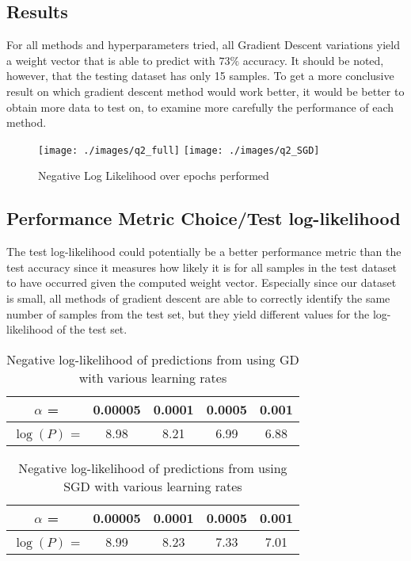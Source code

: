\subsection{Results}
For all methods and hyperparameters tried, all Gradient Descent variations yield a weight vector that is able to predict with $73\%$ accuracy. It should be noted, however, that the testing dataset has only 15 samples. To get a more conclusive result on which gradient descent method would work better, it would be better to obtain more data to test on, to examine more carefully the performance of each method.

\begin{figure}[H]
\centering
\texttt{[image: ./images/q2\_full]}
\texttt{[image: ./images/q2\_SGD]}
\caption{Negative Log Likelihood over epochs performed}
\end{figure}

\subsection{Performance Metric Choice/Test log-likelihood}
The test log-likelihood could potentially be a better performance metric than the test accuracy since it measures how likely it is for all samples in the test dataset to have occurred given the computed weight vector. Especially since our dataset is small, all methods of gradient descent are able to correctly identify the same number of samples from the test set, but they yield different values for the log-likelihood of the test set.

\begin{table}
\begin{center}
\begin{tabular}{|c|c|c|c|c|}
\hline
$\alpha$ =& 0.00005 & 0.0001 & 0.0005 & 0.001\\ \hline
$\log(P)$ = &8.98&8.21&6.99&6.88 \\ \hline
\hline
\end{tabular}
\caption{Negative log-likelihood of predictions from using GD with various learning rates}
\end{center}
\end{table}

\begin{table}
\begin{center}
\begin{tabular}{|c|c|c|c|c|}
\hline
$\alpha$ =& 0.00005 & 0.0001 & 0.0005 & 0.001\\ \hline
$\log(P)$ = &8.99&8.23&7.33&7.01 \\ \hline
\hline
\end{tabular}
\caption{Negative log-likelihood of predictions from using SGD with various learning rates}
\end{center}
\end{table}

